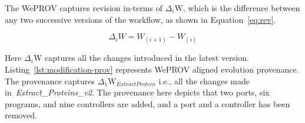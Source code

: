 \documentclass[ao]{iosart2x}
\begin{document}
The WePROV captures revision in-terms of $\Delta_i$W, which is the difference between any two successive versions of the workflow, as shown in Equation~\ref{eq:rev}. 

\begin{equation}
\label{eq:rev}
    \Delta_i W =  W_{(i+1)} - W_{(i)}
\end{equation}

Here $\Delta_i$W captures all the changes introduced in the latest version.
Listing~\ref{lst:modification-prov} represents WePROV aligned evolution provenance. The provenance captures $\Delta_1$W$_{ExtractProtein}$ i.e., all the changes made in~\textit{Extract\_Proteins\_v2}. The provenance here depicts that two ports, six programs, and nine controllers are added, and a port and a controller has been removed.  
\end{document}
